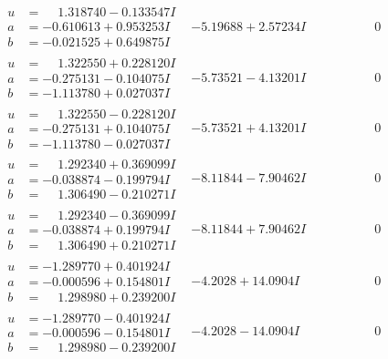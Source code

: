 \documentclass[1p]{elsarticle_modified}
\theoremstyle{definition}
\begin{document}
$$\begin{array}{c|c|c}
\begin{aligned}
u &= \phantom{-}1.318740 - 0.133547 I \\
a &= -0.610613 + 0.953253 I \\
b &= -0.021525 + 0.649875 I\end{aligned}
 & -5.19688 + 2.57234 I & \phantom{-0.000000 } 0 \\ \hline\begin{aligned}
u &= \phantom{-}1.322550 + 0.228120 I \\
a &= -0.275131 - 0.104075 I \\
b &= -1.113780 + 0.027037 I\end{aligned}
 & -5.73521 - 4.13201 I & \phantom{-0.000000 } 0 \\ \hline\begin{aligned}
u &= \phantom{-}1.322550 - 0.228120 I \\
a &= -0.275131 + 0.104075 I \\
b &= -1.113780 - 0.027037 I\end{aligned}
 & -5.73521 + 4.13201 I & \phantom{-0.000000 } 0 \\ \hline\begin{aligned}
u &= \phantom{-}1.292340 + 0.369099 I \\
a &= -0.038874 - 0.199794 I \\
b &= \phantom{-}1.306490 - 0.210271 I\end{aligned}
 & -8.11844 - 7.90462 I & \phantom{-0.000000 } 0 \\ \hline\begin{aligned}
u &= \phantom{-}1.292340 - 0.369099 I \\
a &= -0.038874 + 0.199794 I \\
b &= \phantom{-}1.306490 + 0.210271 I\end{aligned}
 & -8.11844 + 7.90462 I & \phantom{-0.000000 } 0 \\ \hline\begin{aligned}
u &= -1.289770 + 0.401924 I \\
a &= -0.000596 + 0.154801 I \\
b &= \phantom{-}1.298980 + 0.239200 I\end{aligned}
 & -4.2028 + 14.0904 I & \phantom{-0.000000 } 0 \\ \hline\begin{aligned}
u &= -1.289770 - 0.401924 I \\
a &= -0.000596 - 0.154801 I \\
b &= \phantom{-}1.298980 - 0.239200 I\end{aligned}
 & -4.2028 - 14.0904 I & \phantom{-0.000000 } 0\\

\end{array}$$
\end{document}
